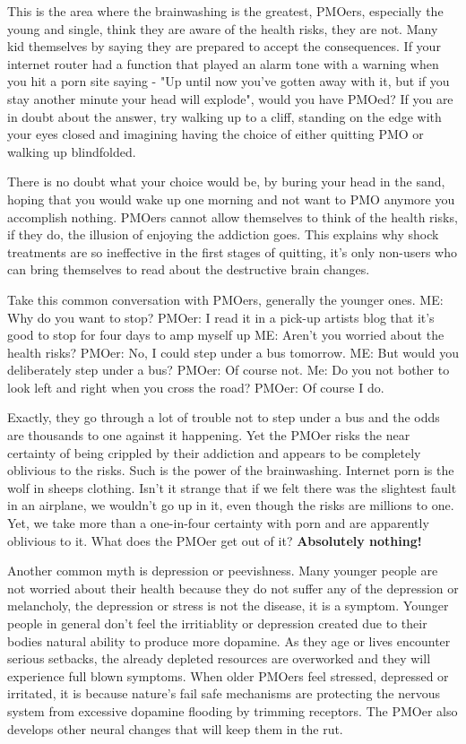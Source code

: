 \documentclass[easypeasy.tex]{subfiles}
\begin{document}
This is the area where the brainwashing is the greatest, PMOers, especially the young and single, think they are aware of the health risks, they are not. Many kid themselves by saying they are prepared to accept the consequences. If your internet router had a function that played an alarm tone with a warning when you hit a porn site saying - "Up until now you've gotten away with it, but if you stay another minute your head will explode", would you have PMOed? If you are in doubt about the answer, try walking up to a cliff, standing on the edge with your eyes closed and imagining having the choice of either quitting PMO or walking up blindfolded.

There is no doubt what your choice would be, by buring your head in the sand, hoping that you would wake up one morning and not want to PMO anymore you accomplish nothing. PMOers cannot allow themselves to think of the health risks, if they do, the illusion of enjoying the addiction goes. This explains why shock treatments are so ineffective in the first stages of quitting, it's only non-users who can bring themselves to read about the destructive brain changes.

Take this common conversation with PMOers, generally the younger ones.
  ME: Why do you want to stop?
  PMOer: I read it in a pick-up artists blog that it's good to stop for four days to amp myself up
  ME: Aren't you worried about the health risks?
  PMOer: No, I could step under a bus tomorrow.
  ME: But would you deliberately step under a bus?
  PMOer: Of course not.
  Me: Do you not bother to look left and right when you cross the road?
  PMOer: Of course I do.

Exactly, they go through a lot of trouble not to step under a bus and the odds are thousands to one against it happening. Yet the PMOer risks the near certainty of being crippled by their addiction and appears to be completely oblivious to the risks. Such is the power of the brainwashing. Internet porn is the wolf in sheeps clothing. Isn't it strange that if we felt there was the slightest fault in an airplane, we wouldn't go up in it, even though the risks are millions to one. Yet, we take more than a one-in-four certainty with porn and are apparently oblivious to it. What does the PMOer get out of it? \textbf{Absolutely nothing!}

Another common myth is depression or peevishness. Many younger people are not worried about their health because they do not suffer any of the depression or melancholy, the depression or stress is not the disease, it is a symptom. Younger people in general don't feel the irritiablity or depression created due to their bodies natural ability to produce more dopamine. As they age or lives encounter serious setbacks, the already depleted resources are overworked and they will experience full blown symptoms. When older PMOers feel stressed, depressed or irritated, it is because nature's fail safe mechanisms are protecting the nervous system from excessive dopamine flooding by trimming receptors. The PMOer also develops other neural changes that will keep them in the rut.
\end{document}
